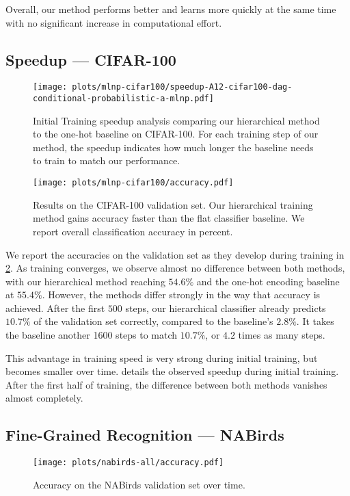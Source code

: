 \documentclass[10pt,twocolumn,letterpaper]{article}
\begin{document}
Overall, our method performs better and learns more quickly at the same time with no significant
increase in computational effort.


\subsection{Speedup --- CIFAR-100}
\begin{figure}
\centering
\texttt{[image: plots/mlnp-cifar100/speedup-A12-cifar100-dag-conditional-probabilistic-a-mlnp.pdf]}
\caption{Initial Training speedup analysis comparing our hierarchical method to the one-hot baseline on CIFAR-100. For each training
step of our method, the speedup indicates how much longer the baseline needs to train to match our performance.}
\label{fig:expcifarspeedup}
\end{figure}

\begin{figure}
\centering
\texttt{[image: plots/mlnp-cifar100/accuracy.pdf]}
\caption{Results on the CIFAR-100 validation set. Our hierarchical training method gains accuracy faster than the
flat classifier baseline. We report overall classification accuracy in percent.}
\label{fig:expcifargraph}
\end{figure}


We report the accuracies on the validation set as they develop during training in
\cref{fig:expcifargraph}. As training converges, we observe almost no difference
between both methods, with our hierarchical method reaching $54.6\%$ and the one-hot
encoding baseline at $55.4\%$. However, the methods differ strongly in the way that accuracy is
achieved. After the first $500$ steps, our hierarchical classifier already predicts $10.7\%$ of
the validation set correctly, compared to the baseline's $2.8\%$. It takes the baseline another
1600 steps to match $10.7\%$, or $4.2$ times as many steps.

This advantage in training speed is very strong during initial training, but becomes smaller
over time.  details the observed speedup during initial training.
After the first half of training, the difference between both methods vanishes almost completely.


\subsection{Fine-Grained Recognition --- NABirds}
\label{sec:exp-nabirds}
\begin{figure}
\centering
\texttt{[image: plots/nabirds-all/accuracy.pdf]}
\caption{Accuracy on the NABirds validation set over time.}
\label{fig:expnabirdsgraph}
\end{figure}
\end{document}
